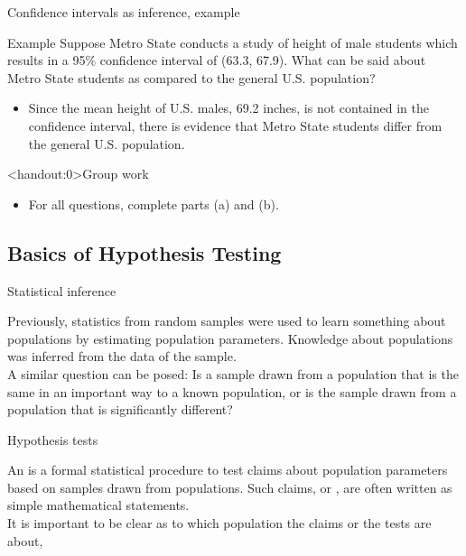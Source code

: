 \documentclass[xcolor=table, aspectratio=169, bigger, handout]{beamer}
\begin{document}
\begin{frame}{Confidence intervals as inference, example}
\begin{exampleblock}{Example}
Suppose Metro State conducts a study of height of male students which results in a 95\% confidence interval of (63.3, 67.9). What can be said about Metro State students as compared to the general U.S. population?
\begin{itemize}
\pause\item Since the mean height of U.S. males, 69.2 inches, is not contained in the confidence interval, there is evidence that Metro State students differ from the general U.S. population. 
\end{itemize}
\end{exampleblock}
\end{frame}

\begin{frame}<handout:0>{Group work}
\begin{block}{}
\large
\begin{itemize}
\item For all questions, complete parts (a) and (b).
\end{itemize}
\end{block}
\end{frame}

%
%
\subsection{Basics of Hypothesis Testing}

\begin{frame}{Statistical inference}
\begin{block}{}
Previously, statistics from random samples were used to learn something about populations by estimating population parameters. Knowledge about populations was inferred from the data of the sample.\\
\medskip
A similar question can be posed: Is a sample drawn from a population that is the same in an important way to a known population, or is the sample drawn from a population that is significantly different?
\end{block}

\end{frame}


\begin{frame}{Hypothesis tests}
\begin{block}{}
An  is a formal statistical procedure to test claims about population parameters based on samples drawn from populations. Such claims, or , are often written as simple mathematical statements.\\
\medskip
It is important to be clear as to which population the claims or the tests are about,
\end{block}
\end{frame}
\end{document}
